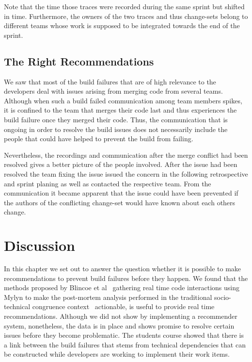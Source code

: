 Note that the time those traces were recorded during the same sprint but shifted in time.
Furthermore, the owners of the two traces and thus change-sets belong to different teams whose work is supposed to be integrated towards the end of the sprint.

\subsection{The Right Recommendations}
We saw that most of the build failures that are of high relevance to the developers deal with issues arising from merging code from several teams.
Although when such a build failed communication among team members spikes, it is confined to the team that merges their code last and thus experiences the build failure once they merged their code.
Thus, the communication that is ongoing in order to resolve the build issues does not necessarily include the people that could have helped to prevent the build from failing.

Nevertheless, the recordings and communication after the merge conflict had been resolved gives a better picture of the people involved.
After the issue had been resolved the team fixing the issue issued the concern in the following retrospective and sprint planing as well as contacted the respective team.
From the communication it became apparent that the issue could have been prevented if the authors of the conflicting change-set would have known about each others change.

\section{Discussion}
In this chapter we set out to answer the question whether it is possible to make recommendations to prevent build failures before they happen.
We found that the methods proposed by Blincoe et al~\cite{blincoe:cscw:2012} gathering real time code interactions using Mylyn to make the post-mortem analysis performed in the traditional socio-technical congruence context~\cite{kersten:aosd:2005} actionable, is useful to provide real time recommendations.
Although we did not show by implementing a recommender system, nonetheless, the data is in place and shows promise to resolve certain issues before they become problematic.
The students course showed that there is a link between the build failures that stems from technical dependencies that can be constructed while developers are working to implement their work items.

